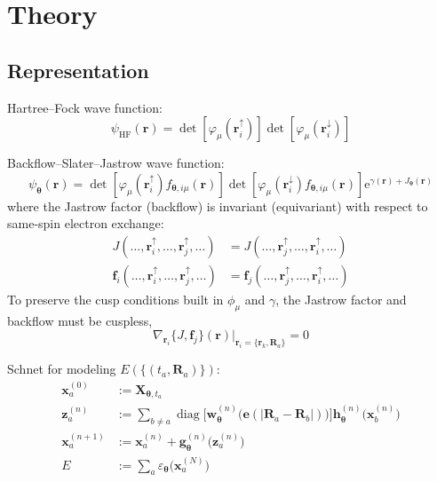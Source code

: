 
\section{Theory}

\subsection{Representation}

Hartree--Fock wave function:
\begin{equation}
\psi_\mathrm{HF}(\mathbf r)=\det[\varphi_\mu(\mathbf r_i^\uparrow)]\det[\varphi_\mu(\mathbf r_i^\downarrow)]
\end{equation}

Backflow--Slater--Jastrow wave function:
\begin{equation}
\psi_{\boldsymbol\theta}(\mathbf r)=
\det[\varphi_\mu(\mathbf r_i^\uparrow)
  f_{\boldsymbol\theta,i\mu}(\mathbf r)]
\det[\varphi_\mu(\mathbf r_i^\downarrow)
  f_{\boldsymbol\theta,i\mu}(\mathbf r)]
\mathrm e^{\gamma(\mathbf r)+J_{\boldsymbol\theta}(\mathbf r)}
\end{equation}
where the Jastrow factor (backflow) is invariant (equivariant) with respect to same-spin electron exchange:
\begin{equation}
\begin{aligned}
J(\ldots,\mathbf r_i^\uparrow,\ldots,\mathbf r_j^\uparrow,\ldots)
&=J(\ldots,\mathbf r_j^\uparrow,\ldots,\mathbf r_i^\uparrow,\ldots) \\
\mathbf f_i(\ldots,\mathbf r_i^\uparrow,
  \ldots,\mathbf r_j^\uparrow,\ldots)
&=\mathbf f_j(\ldots,\mathbf r_j^\uparrow,
  \ldots,\mathbf r_i^\uparrow,\ldots)
\end{aligned}
\end{equation}
To preserve the cusp conditions built in $\phi_\mu$ and $\gamma$, the Jastrow factor and backflow must be cuspless,
\begin{equation}
\nabla_{\mathbf r_i}\{J,\mathbf f_j\}(\mathbf r)
  \big\rvert_{\mathbf r_i=\{\mathbf r_k,\mathbf R_a\}}=0
\end{equation}

Schnet for modeling $E(\{(t_a,\mathbf R_a)\})$:
\begin{equation}
\begin{aligned}
\mathbf x_a^{(0)}&:=\mathbf X_{\boldsymbol\theta,t_a} \\
\mathbf z_a^{(n)}&:=\sum\nolimits_{b\neq a}\operatorname{diag}
  \big[\mathbf w_{\boldsymbol\theta}^{(n)}
  \big(\mathbf e(\lvert\mathbf R_a-\mathbf R_b\rvert)\big)
  \big]\mathbf h^{(n)}_{\boldsymbol\theta}
  \big(\mathbf x_b^{(n)}\big) \\
\mathbf x_a^{(n+1)}&:=\mathbf x_a^{(n)}
  +\mathbf g_{\boldsymbol\theta}^{(n)}
  \big(\mathbf z_a^{(n)}\big) \\
E&:=\sum\nolimits_a\varepsilon_{\boldsymbol\theta}
  \big(\mathbf x_a^{(N)}\big)
\end{aligned}
\end{equation}

